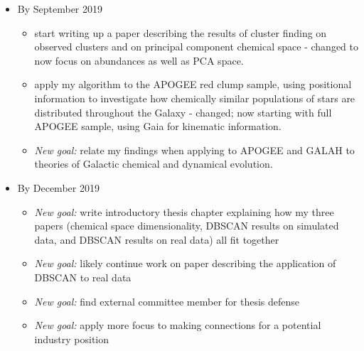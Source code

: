 \documentclass[11pt]{article}
\begin{document}
\begin{itemize}
\item By September 2019
\begin{itemize}
\item {start writing up a paper describing the results of cluster finding on observed clusters and on principal component chemical space} - changed to now focus on abundances as well as PCA space.
\item {\color{ForestGreen} apply my algorithm to the APOGEE red clump sample, using positional information to investigate how chemically similar populations of stars are distributed throughout the Galaxy} - changed; now starting with full APOGEE sample, using Gaia for kinematic information.
\item \emph{New goal:} relate my findings when applying to APOGEE and GALAH to theories of Galactic chemical and dynamical evolution.
\end{itemize}
\item By December 2019
\begin{itemize}
\item \emph{New goal:} write introductory thesis chapter explaining how my three papers (chemical space dimensionality, DBSCAN results on simulated data, and DBSCAN results on real data) all fit together
\item \emph{New goal:} likely continue work on paper describing the application of DBSCAN to real data
\item \emph{New goal:} find external committee member for thesis defense
\item \emph{New goal:} apply more focus to making connections for a potential industry position
\end{itemize}
\end{itemize}
\end{document}

